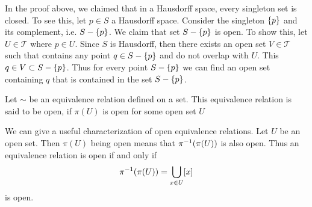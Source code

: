 \begin{remark}
	In the proof above, we claimed that in a Hausdorff space, every singleton set is closed. To see this, let $ p \in S $ a Hausdorff space. Consider the singleton $ \{p\} $ and its complement, i.e. $ S - \{p\} $. We claim that set $ S - \{p\} $ is open. To show this, let $ U \in \mathcal{T} $ where $ p \in U $. Since $ S $ is Hausdorff, then there exists an open set $ V \in \mathcal{T} $ such that contains any point $ q \in S - \{p\} $ and do not overlap with $ U $. This $ q \in V \subset S - \{p\} $. Thus for every point $ S - \{p\} $ we can find an open set containing $ q $ that is contained in the set $ S - \{p\} $.
\end{remark}

\begin{definition}
	Let $ \sim $ be an equivalence relation defined on a set. This equivalence relation is said to be open, if $ \pi(U) $ is open for some open set $ U $
\end{definition}
\begin{remark}
	\label{remark:OpenEquivReleation}
	We can give a useful characterization of open equivalence relations. Let $ U $ be an open set. Then $ \pi(U) $ being open means that $ \pi^{-1}(\pi(U)) $ is also open. Thus an equivalence relation is open if and only if 
	\[ \pi^{-1}(\pi(U)) = \bigcup_{x \in  U} [x] \]
	is open.
\end{remark}

